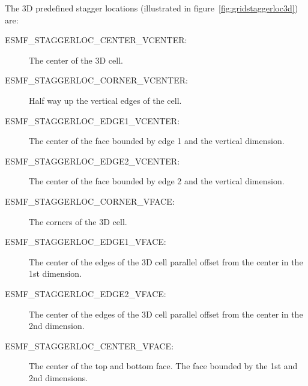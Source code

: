 The 3D predefined stagger locations (illustrated in figure~\ref{fig:gridstaggerloc3d}) are:\\
\begin{description}
\item [ESMF\_STAGGERLOC\_CENTER\_VCENTER:] The center of the 3D cell.
\item [ESMF\_STAGGERLOC\_CORNER\_VCENTER:] Half way up the vertical edges of the cell.
\item [ESMF\_STAGGERLOC\_EDGE1\_VCENTER:] The center of the face bounded by edge 1 and the vertical dimension.
\item [ESMF\_STAGGERLOC\_EDGE2\_VCENTER:] The center of the face bounded by edge 2 and the vertical dimension. 
\item [ESMF\_STAGGERLOC\_CORNER\_VFACE:] The corners of the 3D cell.
\item [ESMF\_STAGGERLOC\_EDGE1\_VFACE:] The center of the edges of the 3D cell parallel offset from the center in the 1st dimension.
\item [ESMF\_STAGGERLOC\_EDGE2\_VFACE:] The center of the edges of the 3D cell parallel offset from the center in the 2nd dimension.
\item [ESMF\_STAGGERLOC\_CENTER\_VFACE:] The center of the top and bottom face. The face bounded by the 1st and 2nd dimensions. 
\end{description}


